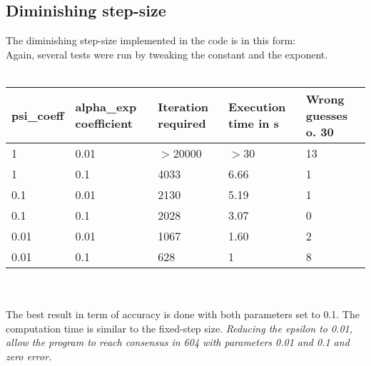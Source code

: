 \documentclass[a4paper,11pt,oneside]{book}
\begin{document}
\subsection{Diminishing step-size} \label{Subsec2.2.5}
The diminishing step-size implemented in the code is in this form:\\
Again, several tests were run by tweaking the constant and the exponent.\\ \\
\begin{tabularx}{\textwidth}{|X|X|X|X|X|}
\hline
\textbf{psi\_coeff} & \textbf{alpha\_exp coefficient} & \textbf{Iteration required} & \textbf{Execution time in s} & \textbf{Wrong guesses o. 30}\\
\hline
1 & 0.01 & $>$20000 & $>$30 & 13\\
\hline
1 & 0.1 & 4033 & 6.66 & 1\\
\hline
0.1 & 0.01 & 2130 & 5.19 & 1\\
\hline
0.1 & 0.1 & 2028 & 3.07 & 0\\
\hline
0.01 & 0.01 & 1067 & 1.60 & 2\\
\hline
0.01 & 0.1 & 628 & 1 & 8\\
\hline
\end{tabularx}
\\ \\
The best result in term of accuracy is done with both parameters set to 0.1. The computation time is similar to the fixed-step size. \textit{Reducing the epsilon to 0.01, allow the program to reach consensus in 604 with parameters 0.01 and 0.1 and zero error.}
\end{document}

